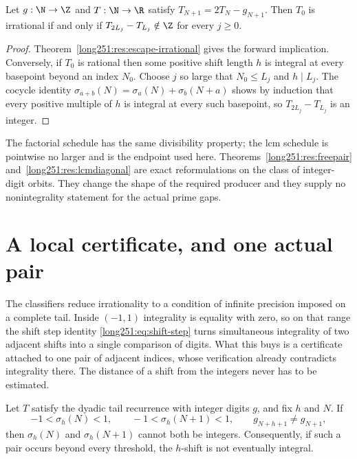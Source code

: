 \begin{theorem}\label{long251:res:lcmdiagonal}
Let $g:\N\to\Z$ and $T:\N\to\R$ satisfy $T_{N+1}=2T_N-g_{N+1}$.  Then
$T_0$ is irrational if and only if
$T_{2L_j}-T_{L_j}\notin\Z$ for every $j\ge0$.
\end{theorem}

\begin{proof}
Theorem~\ref{long251:res:escape-irrational} gives the forward implication.  Conversely,
if $T_0$ is rational then some positive shift length $h$ is integral at every
basepoint beyond an index $N_0$.  Choose $j$ so large that $N_0\le L_j$ and
$h\mid L_j$.  The cocycle identity
$\sigma_{a+b}(N)=\sigma_a(N)+\sigma_b(N+a)$ shows by induction that every
positive multiple of $h$ is integral at every such basepoint, so
$T_{2L_j}-T_{L_j}$ is an integer.
\end{proof}

The factorial schedule has the same divisibility property; the lcm schedule is
pointwise no larger and is the endpoint used here.  Theorems~\ref{long251:res:freepair}
and~\ref{long251:res:lcmdiagonal} are exact reformulations on the class of
integer-digit orbits.  They change the shape of the required producer and they
supply no nonintegrality statement for the actual prime gaps.

\section{A local certificate, and one actual pair}\label{long251:sec:local-certificate}

The classifiers reduce irrationality to a condition of infinite precision
imposed on a complete tail.  Inside $(-1,1)$ integrality is equality with zero,
so on that range the shift step identity \eqref{long251:eq:shift-step} turns
simultaneous integrality of two adjacent shifts into a single comparison of
digits.  What this buys is a certificate attached to one pair of adjacent
indices, whose verification already contradicts integrality there.  The
distance of a shift from the integers never has to be estimated.

\begin{theorem}\label{long251:res:smallpair}
Let $T$ satisfy the dyadic tail recurrence with integer digits $g$, and fix
$h$ and $N$.  If
\[
 -1<\sigma_h(N)<1,\qquad -1<\sigma_h(N+1)<1,
 \qquad g_{N+h+1}\ne g_{N+1},
\]
then $\sigma_h(N)$ and $\sigma_h(N+1)$ cannot both be integers.  Consequently,
if such a pair occurs beyond every threshold, the $h$-shift is not eventually
integral.
\end{theorem}

